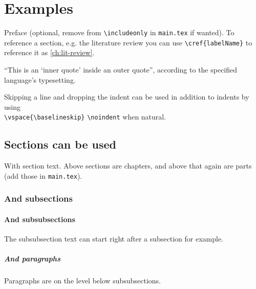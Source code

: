 \chapter{Examples}
\label{ch:04}

Preface (optional, remove from \texttt{\textbackslash includeonly} in \texttt{main.tex} if wanted). To reference a section, e.g. the literature review you can use \texttt{\textbackslash cref\{labelName\}} to reference it as \cref{ch:lit-review}. 

\enquote{This is an \enquote{inner quote} inside an outer quote}, according to the specified language's typesetting.

\vspace{\baselineskip}
\noindent
Skipping a line and dropping the indent can be used in addition to indents by using \\ \texttt{\textbackslash vspace\{\textbackslash baselineskip\}} \texttt{\textbackslash noindent} when natural.




\section{Sections can be used}
With section text. Above sections are chapters, and above that again are parts (add those in \texttt{main.tex}).

\subsection{And subsections}

\subsubsection{And subsubsections}
The subsubsection text can start right after a subsection for example.

\paragraph{And paragraphs}
Paragraphs are on the level below subsubsections.


